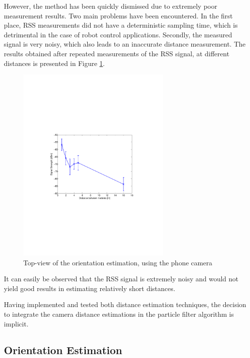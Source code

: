 \documentclass[journal]{IEEEtran}
\let\MYoriglatexcaption\caption
\renewcommand{\caption}[2][\relax]{\MYoriglatexcaption[#2]{#2}}
\begin{document}
However, the method has been quickly dismissed due to extremely poor measurement results. Two main problems have been encountered. In the first place, RSS measurements did not have a deterministic sampling time, which is detrimental in the case of robot control applications. Secondly, the measured signal is very noisy, which also leads to an inaccurate distance measurement. The results obtained after repeated measurements of the RSS signal, at different distances is presented in Figure \ref{fig:rss}.
%
\begin{figure}[htpb]
 \centering
\includegraphics[width=3in]{images/rss_variance}
\caption{Top-view of the orientation estimation, using the phone camera}
\label{fig:rss}
\end{figure}
%
It can easily be observed that the RSS signal is extremely noisy and would not yield good results in estimating relatively short distances.

Having implemented and tested both distance estimation techniques, the decision to integrate the camera distance estimations in the particle filter algorithm is implicit.

\subsection{Orientation Estimation}
\end{document}
